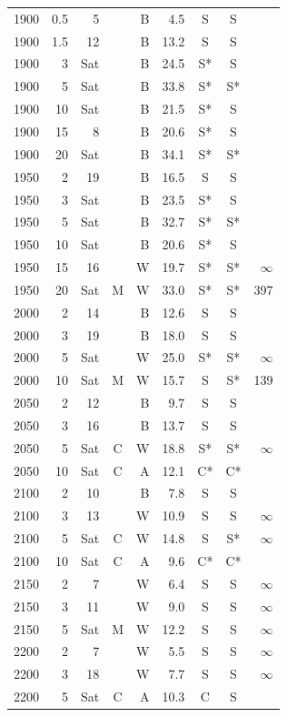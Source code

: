 \begin{table}[!htbp]
\begin{tabular}{@{}rrrcrrccr@{}}
1900 & 0.5 & 5 &  & B & 4.5 & S & S & \\
1900 & 1.5 & 12 &  & B & 13.2 & S & S & \\
1900 & 3 & Sat &  & B & 24.5 & S* & S & \\
1900 & 5 & Sat &  & B & 33.8 & S* & S* & \\
1900 & 10 & Sat &  & B & 21.5 & S* & S & \\
1900 & 15 & 8 &  & B & 20.6 & S* & S & \\
1900 & 20 & Sat &  & B & 34.1 & S* & S* & \\
1950 & 2 & 19 &  & B & 16.5 & S & S & \\
1950 & 3 & Sat &  & B & 23.5 & S* & S & \\
1950 & 5 & Sat &  & B & 32.7 & S* & S* & \\
1950 & 10 & Sat &  & B & 20.6 & S* & S & \\
1950 & 15 & 16 &  & W & 19.7 & S* & S* & $\infty$\\
1950 & 20 & Sat & M & W & 33.0 & S* & S* & 397\\
2000 & 2 & 14 &  & B & 12.6 & S & S & \\
2000 & 3 & 19 &  & B & 18.0 & S & S & \\
2000 & 5 & Sat &  & W & 25.0 & S* & S* & $\infty$\\
2000 & 10 & Sat & M & W & 15.7 & S & S* & 139\\
2050 & 2 & 12 &  & B & 9.7 & S & S & \\
2050 & 3 & 16 &  & B & 13.7 & S & S & \\
2050 & 5 & Sat & C & W & 18.8 & S* & S* & $\infty$\\
2050 & 10 & Sat & C & A & 12.1 & C* & C* & \\
2100 & 2 & 10 &  & B & 7.8 & S & S & \\
2100 & 3 & 13 &  & W & 10.9 & S & S & $\infty$\\
2100 & 5 & Sat & C & W & 14.8 & S & S* & $\infty$\\
2100 & 10 & Sat & C & A & 9.6 & C* & C* & \\
2150 & 2 & 7 &  & W & 6.4 & S & S & $\infty$\\
2150 & 3 & 11 &  & W & 9.0 & S & S & $\infty$\\
2150 & 5 & Sat & M & W & 12.2 & S & S & $\infty$\\
2200 & 2 & 7 &  & W & 5.5 & S & S & $\infty$\\
2200 & 3 & 18 &  & W & 7.7 & S & S & $\infty$\\
2200 & 5 & Sat & C & A & 10.3 & C & S & \\
    \bottomrule
  \end{tabular}
\end{table}

